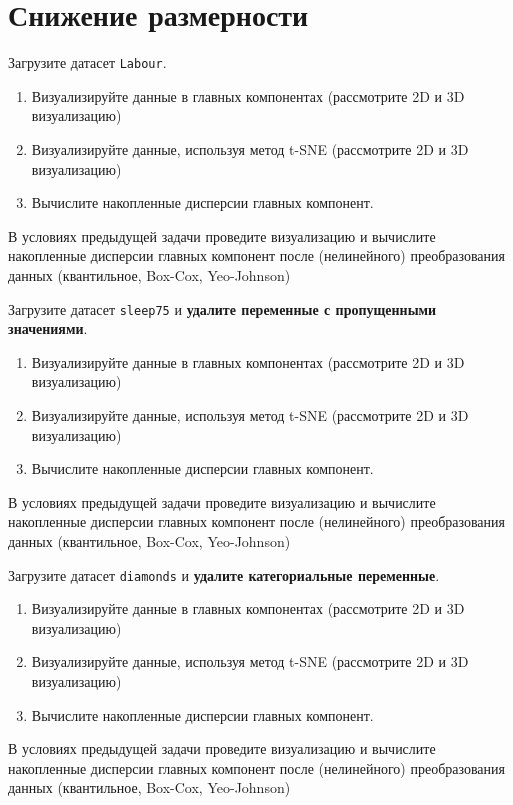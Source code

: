 
\section{Снижение размерности}

\begin{exercise}
Загрузите датасет \texttt{Labour}.
\begin{enumerate}
	\item Визуализируйте данные в главных компонентах (рассмотрите 2D и 3D визуализацию)
	\item Визуализируйте данные, используя метод t-SNE (рассмотрите 2D и 3D визуализацию)
	\item Вычислите накопленные дисперсии главных компонент.
\end{enumerate}
\end{exercise}

\begin{exercise}
В условиях предыдущей задачи проведите визуализацию и вычислите накопленные дисперсии главных компонент
после (нелинейного) преобразования данных (квантильное, Box-Cox, Yeo-Johnson)
\end{exercise}

\begin{exercise}
Загрузите датасет \texttt{sleep75} и \textbf{удалите переменные с пропущенными значениями}.
\begin{enumerate}
	\item Визуализируйте данные в главных компонентах (рассмотрите 2D и 3D визуализацию)
	\item Визуализируйте данные, используя метод t-SNE (рассмотрите 2D и 3D визуализацию)
	\item Вычислите накопленные дисперсии главных компонент.
\end{enumerate}
\end{exercise}
	
\begin{exercise}
В условиях предыдущей задачи проведите визуализацию и вычислите накопленные дисперсии главных компонент
после (нелинейного) преобразования данных (квантильное, Box-Cox, Yeo-Johnson)
\end{exercise}

\begin{exercise}
Загрузите датасет \texttt{diamonds} и \textbf{удалите категориальные переменные}.
\begin{enumerate}
	\item Визуализируйте данные в главных компонентах (рассмотрите 2D и 3D визуализацию)
	\item Визуализируйте данные, используя метод t-SNE (рассмотрите 2D и 3D визуализацию)
	\item Вычислите накопленные дисперсии главных компонент.
\end{enumerate}
\end{exercise}
	
\begin{exercise}
В условиях предыдущей задачи проведите визуализацию и вычислите накопленные дисперсии главных компонент
после (нелинейного) преобразования данных (квантильное, Box-Cox, Yeo-Johnson)
\end{exercise}